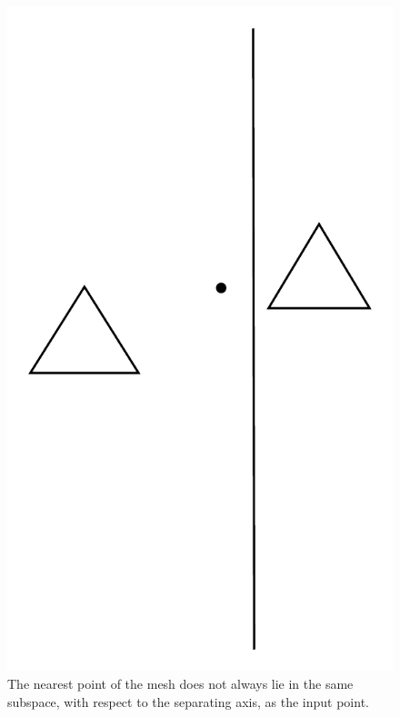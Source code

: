 \begin{figure}[H]
  \centering
  \includegraphics[scale=0.4]{Figures/nearest-neighbour.pdf}
  \caption{The nearest point of the mesh does not always lie in the same subspace, with respect to the separating axis, as the input point.}
  \label{fig:nearest-neighbour}
\end{figure}

